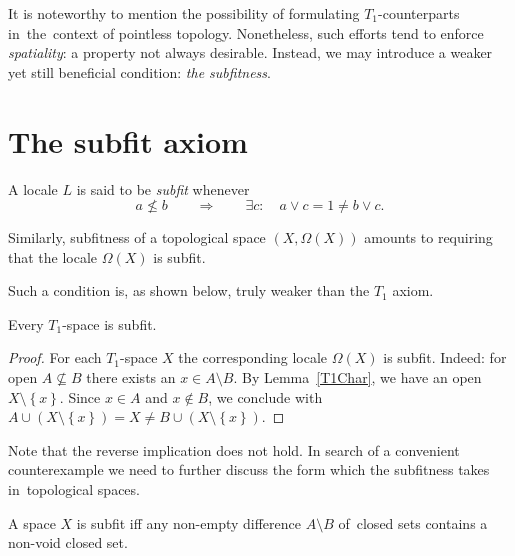 It is noteworthy to mention the possibility of formulating $T_1$-counterparts
in~the~context of pointless topology.
Nonetheless, such efforts tend to enforce {\sl spatiality\/}: a property not
always desirable.
Instead, we may introduce a weaker yet still beneficial condition: {\sl the
subfitness\/}.

\section{The subfit axiom}

\begin{framed}
  \begin{df}[Sfit]
    A locale $L$ is said to be \emph{subfit\/} whenever
    \[
      a \not\le b \qquad \Rightarrow \qquad \exists c: \quad a \vee c = 1 \ne b
      \vee c.
    \]
  \end{df}
\end{framed}

Similarly, subfitness of a topological space $(X, \Omega(X))$ amounts to
requiring that the locale $\Omega(X)$ is subfit.

Such a condition is, as shown below, truly weaker than the $T_1$ axiom.

\begin{prop} \label{T1->Sfit}
  Every $T_1$-space is subfit.
\end{prop}

\begin{proof}
  For each $T_1$-space $X$ the corresponding locale $\Omega(X)$ is subfit.
  Indeed: for open $A\not\subseteq B$ there exists an $x\in A \setminus B$.
  By Lemma~\ref{T1Char}\thinspace, we have an open $X\setminus
  \left\{x\right\}$.
  Since $x\in A$ and $x\not\in B$, we conclude with $A\cup (X\setminus
  \left\{x\right\}) = X \ne B \cup (X\setminus \left\{x\right\})$.
\end{proof}

Note that the reverse implication does not hold.
In search of a convenient counterexample we need to further discuss the form
which the subfitness takes in~topological spaces.

\begin{prop}
  A space $X$ is subfit iff any non-empty difference $A\setminus B$ of~closed
  sets contains a non-void closed set.
\end{prop}

